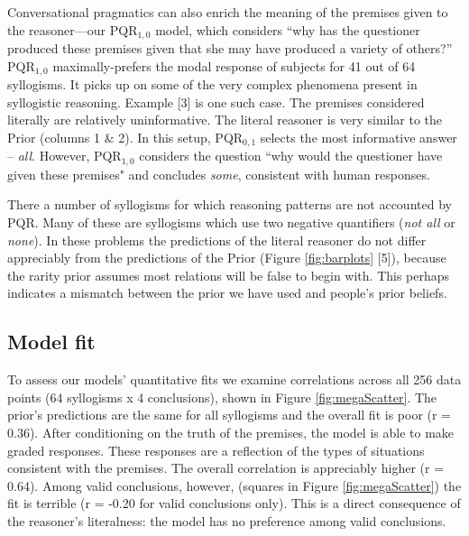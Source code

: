 \documentclass[10pt,letterpaper]{article}
\begin{document}
Conversational pragmatics can also enrich the meaning of the premises given to the reasoner---our PQR$_{1,0}$ model, which considers ``why has the questioner produced these premises given that she may have produced a variety of others?'' 
PQR$_{1,0}$ maximally-prefers the modal response of subjects for 41 out of 64 syllogisms. It picks up on some of the very complex phenomena present in syllogistic reasoning. Example [3] is one such case. The premises considered literally are relatively uninformative. The literal reasoner is very similar to the Prior (columns 1 \& 2). In this setup, PQR$_{0,1}$ selects the most informative answer -- \emph{all}. However, PQR$_{1,0}$ considers the question ``why would the questioner have given these premises" and concludes \emph{some}, consistent with human responses. 

There a number of syllogisms for which reasoning patterns are not accounted by PQR. Many of these are syllogisms which use two negative quantifiers (\emph{not all} or \emph{none}). In these problems the predictions of the literal reasoner do not differ appreciably from the predictions of the Prior (Figure \ref{fig:barplots} [5]), because the rarity prior assumes most relations will be false to begin with. This perhaps indicates a mismatch between the prior we have used and people's prior beliefs.

\subsection{Model fit}

To assess our models' quantitative fits we examine correlations across all 256 data points (64 syllogisms x 4 conclusions), shown in Figure \ref{fig:megaScatter}.
%
The prior's predictions are the same for all syllogisms and the overall fit is poor (r = 0.36).  After conditioning on the truth of the premises, the model is able to make graded responses. These responses are a reflection of the types of situations consistent with the premises. The overall correlation is appreciably higher (r = 0.64). Among valid conclusions, however, (squares in Figure \ref{fig:megaScatter}) the fit is terrible (r = -0.20 for valid conclusions only). This is a direct consequence of the reasoner's literalness: the model has no preference among valid conclusions.
\end{document}
